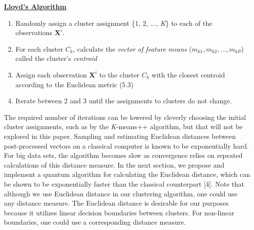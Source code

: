 \documentclass[twocolumn, english]{revtex4-2}
\numberwithin{equation}{section}
\begin{document}
\underline{\textbf{Lloyd's Algorithm}}
\begin{enumerate}
\item Randomly assign a cluster assignment \{1, 2, ..., \textit{K}\} to each of the observations $\textbf{X}^{i}$.
\item For each cluster $C_{k}$, calculate the \textit{vector of feature means} ($m_{k1}, m_{k2}, ..., m_{kP}$) called the cluster's \textit{centroid}
\item Assign each observation $\textbf{X}^{i}$ to the cluster $C_{k}$ with the closest centroid according to the Euclidean metric (5.3)
\item Iterate between 2 and 3 until the assignments to clusters do not change.
\end{enumerate}
The required number of iterations can be lowered by cleverly choosing the initial cluster assignments, such as by the \textit{K}-means++ algorithm, but that will not be explored in this paper. Sampling and estimating Euclidean distances between post-processed vectors on a classical computer is known to be exponentially hard. For big data sets, the algorithm becomes slow as convergence relies on repeated calculations of this distance measure. In the next section, we propose and implement a quantum algorithm for calculating the Euclidean distance, which can be shown to be exponentially faster than the classical counterpart [4]. Note that although we use Euclidean distance in our clustering algorithm, one could use any distance measure. The Euclidean distance is desirable for our purposes because it utilizes linear decision boundaries between clusters. For non-linear boundaries, one could use a corresponding distance measure. 
\end{document}
